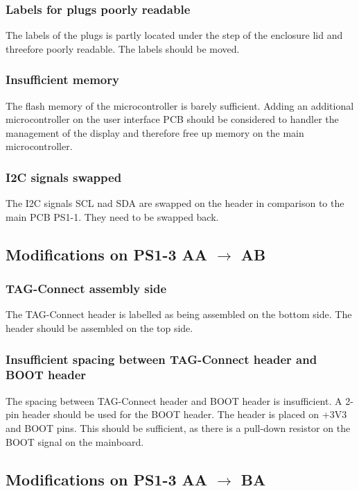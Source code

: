\subsubsection{Labels for plugs poorly readable}
The labels of the plugs is partly located under the step of the enclosure lid and threefore poorly readable. The labels should be moved. 

\subsubsection{Insufficient memory}
The flash memory of the microcontroller is barely sufficient. Adding an additional microcontroller on the user interface PCB should be considered to handler the management of the display and therefore free up memory on the main microcontroller. 

\subsubsection{\acs{I2C} signals swapped}
The \ac{I2C} signals SCL nad SDA are swapped on the header in comparison to the main PCB PS1-1. They need to be swapped back. 

\subsection{Modifications on PS1-3 AA $\to$ AB}

\subsubsection{TAG-Connect assembly side}
The TAG-Connect header is labelled as being assembled on the bottom side. The header should be assembled on the top side. 

\subsubsection{Insufficient spacing between TAG-Connect header and BOOT header}
The spacing between TAG-Connect header and BOOT header is insufficient. A 2-pin header should be used for the BOOT header. The header is placed on +3V3 and BOOT pins. This should be sufficient, as there is a pull-down resistor on the BOOT signal on the mainboard. 

\subsection{Modifications on PS1-3 AA $\to$ BA}

